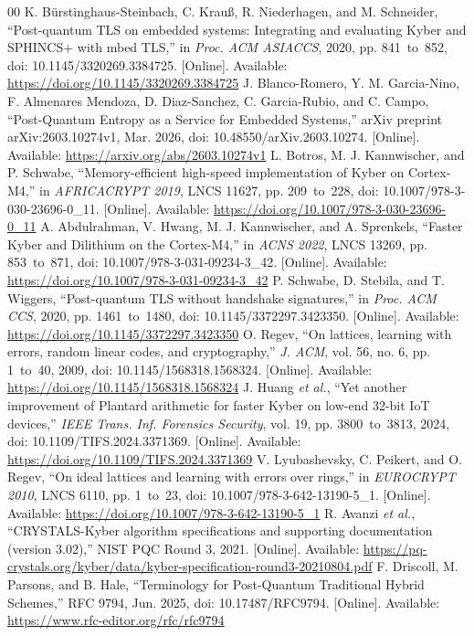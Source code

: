 \documentclass[journal, 10pt]{IEEEtran}
\begin{document}
\begin{thebibliography}{00}
 K. B{\"u}rstinghaus-Steinbach, C. Krau{\ss}, R. Niederhagen, and M. Schneider, ``Post-quantum TLS on embedded systems: Integrating and evaluating Kyber and SPHINCS+ with mbed TLS,'' in \textit{Proc. ACM ASIACCS}, 2020, pp. 841~to~852, doi: 10.1145/3320269.3384725. [Online]. Available: \url{https://doi.org/10.1145/3320269.3384725}
 J. Blanco-Romero, Y. M. Garcia-Nino, F. Almenares Mendoza, D. Diaz-Sanchez, C. Garcia-Rubio, and C. Campo, ``Post-Quantum Entropy as a Service for Embedded Systems,'' arXiv preprint arXiv:2603.10274v1, Mar. 2026, doi: 10.48550/arXiv.2603.10274. [Online]. Available: \url{https://arxiv.org/abs/2603.10274v1}
 L. Botros, M. J. Kannwischer, and P. Schwabe, ``Memory-efficient high-speed implementation of Kyber on Cortex-M4,'' in \textit{AFRICACRYPT 2019}, LNCS 11627, pp. 209~to~228, doi: 10.1007/978-3-030-23696-0\_11. [Online]. Available: \url{https://doi.org/10.1007/978-3-030-23696-0_11}
 A. Abdulrahman, V. Hwang, M. J. Kannwischer, and A. Sprenkels, ``Faster Kyber and Dilithium on the Cortex-M4,'' in \textit{ACNS 2022}, LNCS 13269, pp. 853~to~871, doi: 10.1007/978-3-031-09234-3\_42. [Online]. Available: \url{https://doi.org/10.1007/978-3-031-09234-3_42}
 P. Schwabe, D. Stebila, and T. Wiggers, ``Post-quantum TLS without handshake signatures,'' in \textit{Proc. ACM CCS}, 2020, pp. 1461~to~1480, doi: 10.1145/3372297.3423350. [Online]. Available: \url{https://doi.org/10.1145/3372297.3423350}
 O. Regev, ``On lattices, learning with errors, random linear codes, and cryptography,'' \textit{J. ACM}, vol. 56, no. 6, pp. 1~to~40, 2009, doi: 10.1145/1568318.1568324. [Online]. Available: \url{https://doi.org/10.1145/1568318.1568324}
 J. Huang \textit{et al.}, ``Yet another improvement of Plantard arithmetic for faster Kyber on low-end 32-bit IoT devices,'' \textit{IEEE Trans. Inf. Forensics Security}, vol. 19, pp. 3800~to~3813, 2024, doi: 10.1109/TIFS.2024.3371369. [Online]. Available: \url{https://doi.org/10.1109/TIFS.2024.3371369}
 V. Lyubashevsky, C. Peikert, and O. Regev, ``On ideal lattices and learning with errors over rings,'' in \textit{EUROCRYPT 2010}, LNCS 6110, pp. 1~to~23, doi: 10.1007/978-3-642-13190-5\_1. [Online]. Available: \url{https://doi.org/10.1007/978-3-642-13190-5_1}
 R. Avanzi \textit{et al.}, ``CRYSTALS-Kyber algorithm specifications and supporting documentation (version 3.02),'' NIST PQC Round 3, 2021. [Online]. Available: \url{https://pq-crystals.org/kyber/data/kyber-specification-round3-20210804.pdf}
 F. Driscoll, M. Parsons, and B. Hale, ``Terminology for Post-Quantum Traditional Hybrid Schemes,'' RFC 9794, Jun. 2025, doi: 10.17487/RFC9794. [Online]. Available: \url{https://www.rfc-editor.org/rfc/rfc9794}

\end{thebibliography}
\end{document}
